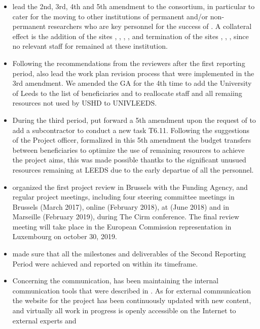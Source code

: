 \begin{itemize}
\item {} lead the 2nd, 3rd, 4th and 5th amendment to the consortium,
  in particular to cater for the moving to other institutions of
  permanent and/or non-permanent researchers who are key personnel for
  the success of \ODK. A collateral effect is the addition of the
  sites , , , , and termination of the
  sites , , ,  
  since no relevant staff for \ODK remained at these institution.
\item Following the recommendations from the reviewers after the first
  reporting period,  also lead the work plan revision process
  that were implemented in the 3rd amendment. We amended the GA for the 4th time to add the University of Leeds to the list of beneficiaries and  to reallocate staff and all remaiing resources not used by USHD to UNIVLEEDS. 
\item During the third period,  put forward a 5th amendment upon the request of 
to add a subcontractor to conduct a new task T6.11. 
Following the suggestions of the Project officer,  formalized 
in this 5th amendment the budget transfers between beneficiaries to optimize 
the use of remaining resources to achieve the project aims, this was made possible thantks to
the significant unusued resources remaining at LEEDS due to the early departue of all the personnel. 
\item {} organized the first project review in Brussels with
  the Funding Agency, and regular project meetings, including four
  steering committee meetings in Brussels (March 2017), online
  (February 2018),  at  (June 2018) and in Marseille (February 2019), during The Cirm conference. 
  The final review meeting will take place in the European Commission representation in Luxembourg on october 30, 2019.
\item {} made sure that all the milestones and deliverables of
  the Second Reporting Period were achieved and reported on within its
  timeframe.
\item Concerning the communication,  has been maintaining the
  internal communication tools that were described in
  . As for external
  communication the website for the project has been continuously
  updated with new content, and virtually all work in progress is
  openly accessible on the Internet to external experts and

\end{itemize}
